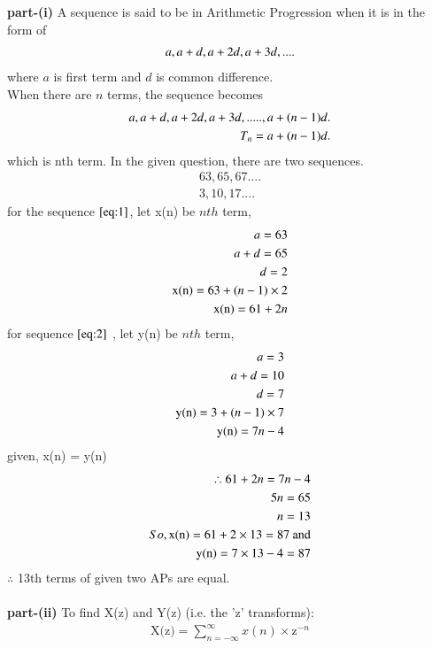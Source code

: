\documentclass[journal,12pt,twocolumn]{IEEEtran}
\theoremstyle{remark}
\begin{document}
\textbf{part-(i)}
A sequence is said to be in Arithmetic Progression when it is in the form of
\begin{align}
\notag a, a+d, a+2d, a+3d,....
\end{align}
where $a$ is first term and $d$ is common difference.\\
When there are $ n$ terms, the sequence becomes
\begin{align}
\notag a, a+d, a+2d, a+3d,....., a+(n-1)d.\\
\notag T_n = a+(n-1)d.
\end{align}
which is nth term.
In the given question, there are two sequences.
\begin{align}
63, 65, 67....\label{eq:1}\\
3, 10, 17....\label{eq:2}
\end{align}
for the sequence $ \eqref{eq:1}$, let x(n) be $ nth$ term,
\begin{align}
\notag a = 63\\
\notag a+d = 65\\
\notag d = 2\\
\notag \text{x(n)} = 63 + (n-1)\times2\\
\text{x(n)} = 61 + 2n \label{eq:3}
\end{align}
for sequence $ \eqref{eq:2}$ , let y(n) be $ nth$ term,
\begin{align}
\notag a = 3 \\
\notag a+d = 10\\
\notag d = 7\\
\notag \text{y(n)} = 3 + (n-1)\times7\\
\text{y(n)} = 7n - 4 \label{eq:4}
\end{align}
given, x(n) = y(n)\\
\begin{align}
\therefore 61 + 2n = 7n -4\\
\notag 5n = 65\\
n = 13\\
\notag So, \text{x(n)} = 61 + 2\times13 = 87 \text{ and}\\
\notag \text{y(n)} = 7\times13 - 4 = 87
\end{align}
$ \therefore$ 13th terms of given two APs are equal.\\\\
\vspace{0.5cm}
\textbf{part-(ii)}
To find X(z) and Y(z) (i.e. the 'z' transforms):\\
\begin{align}
\text{X(z)} = \sum_{n=-\infty}^{\infty} x(n)\times \text{z}^{-n}
\end{align}
\end{document}
